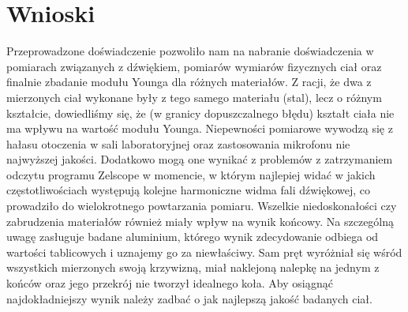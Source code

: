 \documentclass[a4paper,12pts]{article}
\begin{document}
	\section{Wnioski}
		Przeprowadzone doświadczenie pozwoliło nam na nabranie doświadczenia w pomiarach związanych z dźwiękiem, pomiarów wymiarów fizycznych ciał oraz finalnie zbadanie modułu Younga dla różnych materiałów. Z racji, że dwa z mierzonych ciał wykonane były z tego samego materiału (stal), lecz o różnym kształcie, dowiedliśmy się, że (w granicy dopuszczalnego błędu) kształt ciała nie ma wpływu na wartość modułu Younga. Niepewności pomiarowe wywodzą się z hałasu otoczenia w sali laboratoryjnej oraz zastosowania mikrofonu nie najwyższej jakości. Dodatkowo mogą one wynikać z problemów z zatrzymaniem odczytu programu Zelscope w momencie, w którym najlepiej widać w jakich częstotliwościach występują kolejne harmoniczne widma fali dźwiękowej, co prowadziło do wielokrotnego powtarzania pomiaru. Wszelkie niedoskonałości czy zabrudzenia materiałów również miały wpływ na wynik końcowy. Na szczególną uwagę zasługuje badane aluminium, którego wynik zdecydowanie odbiega od wartości tablicowych i uznajemy go za niewłaściwy. Sam pręt wyróżniał się wśród wszystkich mierzonych swoją krzywizną, miał naklejoną nalepkę na jednym z końców oraz jego przekrój nie tworzył idealnego koła. Aby osiągnąć najdokładniejszy wynik należy zadbać o jak najlepszą jakość badanych ciał.
	
\end{document}
